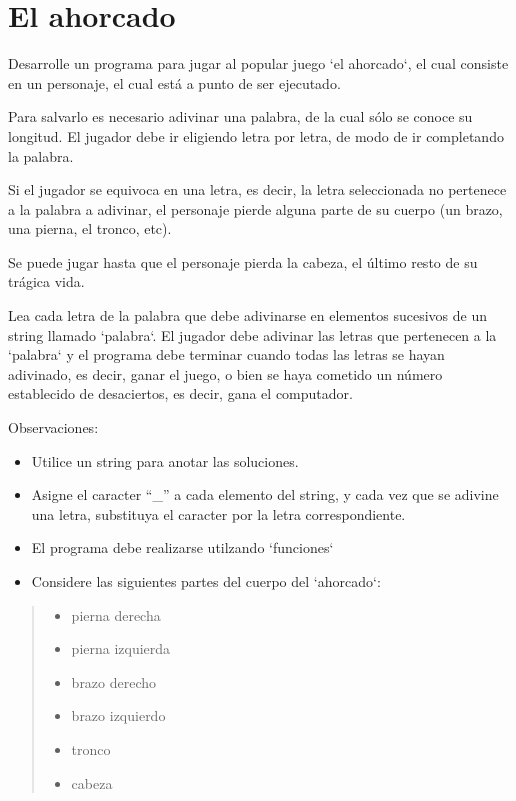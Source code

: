 \section{El ahorcado}

Desarrolle un programa para jugar al popular juego `el ahorcado`, el
cual consiste en un personaje, el cual está a punto de ser ejecutado.

Para salvarlo es necesario adivinar una palabra, de la cual sólo se
conoce su longitud. El jugador debe ir eligiendo letra por letra, de
modo de ir completando la palabra.

Si el jugador se equivoca en una letra, es decir, la letra seleccionada
no pertenece a la palabra a adivinar, el personaje pierde alguna parte
de su cuerpo (un brazo, una pierna, el tronco, etc).

Se puede jugar hasta que el personaje pierda la cabeza, el último resto
de su trágica vida.

Lea cada letra de la palabra que debe adivinarse en elementos sucesivos
de un string llamado `palabra`. El jugador debe adivinar las letras que
pertenecen a la `palabra` y el programa debe terminar cuando todas las
letras se hayan adivinado, es decir, ganar el juego, o bien se haya
cometido un número establecido de desaciertos, es decir, gana el
computador.

Observaciones:

\begin{itemize}
\item
  Utilice un string para anotar las soluciones.
\item
  Asigne el caracter ``\_'' a cada elemento del string, y cada vez que
  se adivine una letra, substituya el caracter por la letra
  correspondiente.
\item
  El programa debe realizarse utilzando `funciones`
\item
  Considere las siguientes partes del cuerpo del `ahorcado`:
\end{itemize}

\begin{quote}
\begin{itemize}
\item
  pierna derecha
\item
  pierna izquierda
\item
  brazo derecho
\item
  brazo izquierdo
\item
  tronco
\item
  cabeza
\end{itemize}
\end{quote}

